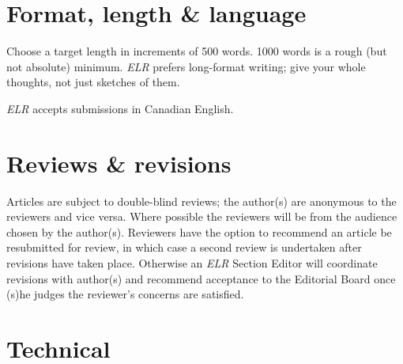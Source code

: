\section{Format, length \& language}
Choose a target length in increments of 500 words.
1000 words is a rough (but not absolute) minimum.
\emph{ELR} prefers long-format writing; give your whole thoughts, not just sketches of them.

\emph{ELR} accepts submissions in Canadian English.

\section{Reviews \& revisions}
Articles are subject to double-blind reviews; the author(s) are anonymous to the reviewers and vice versa.
Where possible the reviewers will be from the audience chosen by the author(s).
Reviewers have the option to recommend an article be resubmitted for review, in which case a second review is undertaken after revisions have taken place.
Otherwise an \emph{ELR} Section Editor will coordinate revisions with author(s) and recommend acceptance to the Editorial Board once (s)he judges the reviewer's concerns are satisfied.

\section{Technical}

